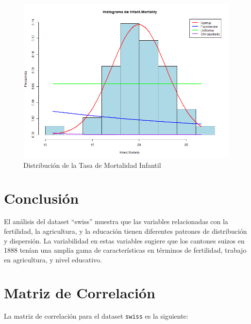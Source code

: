 \documentclass{article}
\begin{document}
\begin{figure}[h!]
\centering
\includegraphics[width=\textwidth]{Histogramas/histogram_infant_mortality.png}
\caption{Distribución de la Tasa de Mortalidad Infantil}
\end{figure}


\section{Conclusión}
El análisis del dataset ``swiss'' muestra que las variables relacionadas con la fertilidad, la agricultura, y la educación tienen diferentes patrones de distribución y dispersión. La variabilidad en estas variables sugiere que los cantones suizos en 1888 tenían una amplia gama de características en términos de fertilidad, trabajo en agricultura, y nivel educativo.

\section{Matriz de Correlación}

La matriz de correlación para el dataset \texttt{swiss} es la siguiente:
\end{document}
